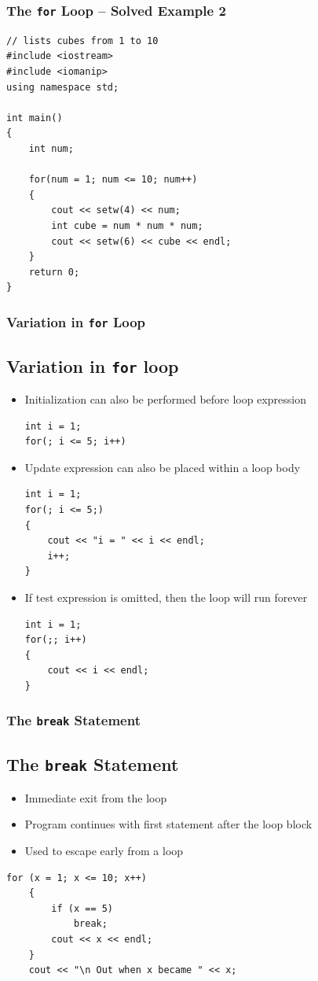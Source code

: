 \documentclass{beamer}
\begin{document}
\begin{frame} [fragile]
    \frametitle{The \texttt{for} Loop -- Solved Example 2}
    \lstset{style=mystyle}
    \begin{lstlisting}
// lists cubes from 1 to 10
#include <iostream>
#include <iomanip>
using namespace std;

int main()
{
    int num;

    for(num = 1; num <= 10; num++)
    {
        cout << setw(4) << num;
        int cube = num * num * num;
        cout << setw(6) << cube << endl;
    }
    return 0;
}
\end{lstlisting}
\end{frame}

\begin{frame}[fragile]
    \frametitle{Variation in \texttt{for} Loop}
    \subsection{Variation in \texttt{for} loop} %
    \begin{itemize}
        \item Initialization can also be performed before loop expression
        \lstset{style=mystyle}
\begin{lstlisting}
int i = 1;
for(; i <= 5; i++)
\end{lstlisting}
        \item Update expression can also be placed within a loop body
        \lstset{style=mystyle}
\begin{lstlisting}
int i = 1;
for(; i <= 5;)
{
    cout << "i = " << i << endl;
    i++;
}
\end{lstlisting}
        \item If test expression is omitted, then the loop will run forever
        \lstset{style=mystyle}
\begin{lstlisting}
int i = 1;
for(;; i++)
{
    cout << i << endl;
}
\end{lstlisting}
    \end{itemize}

\end{frame}

\begin{frame} [fragile]
    \frametitle{The \texttt{break} Statement}
    \subsection{The \texttt{break} Statement} %
    \begin{itemize}
        \item Immediate exit from the loop
        \item Program continues with first statement after the loop block
        \item Used to escape early from a loop
    \end{itemize}
    \lstset{style=mystyle}
\begin{lstlisting}
for (x = 1; x <= 10; x++)
    {
        if (x == 5)
            break;
        cout << x << endl;
    }
    cout << "\n Out when x became " << x;
\end{lstlisting}
\end{frame}
\end{document}
